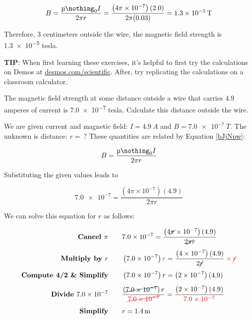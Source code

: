 \documentclass{article}
\numberwithin{equation}{section}
\numberwithin{figure}{section}
\begin{document}
\begin{equation*}
    B=\frac{\mymu_0 I}{2\pi r} = \frac{\left(4\pi \times 10^{-7}\right)(2.0)}{2 \pi (0.03)} = \SI{1.3e-5}{T}
\end{equation*}

Therefore, 3 centimeters outside the wire, the magnetic field strength is \num{1.3e-5} tesla.

\vspace{1em}

\cyanhrule


\begin{mdframed}[backgroundcolor=black!10]
    \textbf{TIP}: When first learning these exercises, it's helpful to first try the calculations on Demos at \href{https://www.desmos.com/scientific}{desmos.com/scientific}. After, try replicating the calculations on a classroom calculator.
\end{mdframed}

\begin{example}
The magnetic field strength at some distance outside a wire that carries 4.9 amperes of current is \num{7.0e-7} tesla. Calculate this distance outside the wire.
\end{example}

\Solution We are given current and magnetic field: $I = \SI{4.9}{A}$ and $B = \SI{7.0e-7}{T}$. The unknown is distance: $r =\ ?$ These quantities are related by Equation \ref{bJjNpw}:

\begin{equation*}
    B = \frac{\mymu_0 I}{2\pi r}
\end{equation*}

Substituting the given values leads to 

\begin{equation*}
    \num{7.0e-7} = \frac{\left(4\pi \times 10^{-7}\right) (4.9)}{2\pi r}
\end{equation*}

We can solve this equation for $r$ as follows:

\begin{align*}
    \textbf{Cancel $\pi$} \qquad &  \num{7.0e-7} = \frac{\left(4\cancel{\pi} \times 10^{-7}\right) (4.9)}{2\cancel{\pi} r}\\[1ex]
    \textbf{Multiply by $r$} \qquad & \left(\num{7.0e-7}\right) \textcolor{red}{r} = \frac{\left(4 \times 10^{-7}\right) (4.9)}{2\cancel{r}} \mathbin{\color{red} \times} \textcolor{red}{\cancel{r}}\\[1ex]
    \textbf{Compute 4/2 \& Simplify} \qquad & \left(\num{7.0e-7}\right) r = \left(\num{2e-7}\right) (4.9)\\[1ex]
    \textbf{Divide \num{7.0e-7}} \qquad & \frac{\left(\cancel{\num{7.0e-7}}\right) r}{\textcolor{red}{\cancel{\num{7.0e-7}}}} = \frac{\left(\num{2e-7}\right) (4.9)}{\textcolor{red}{\num{7.0e-7}}}\\[1ex]
    \textbf{Simplify} \qquad & r = \SI{1.4}{m}
\end{align*}
\end{document}
